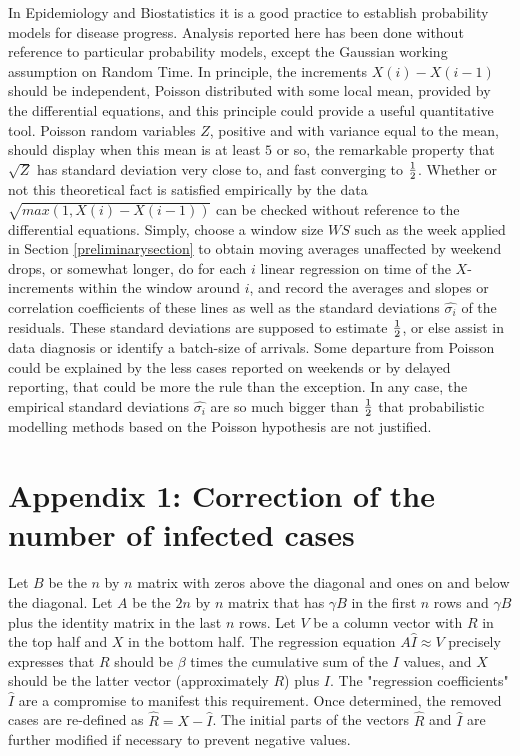 \documentclass{article}
\begin{document}
{In Epidemiology and Biostatistics it is a good practice to establish probability models for disease progress. Analysis reported here has been done without reference to particular probability models, except the Gaussian working assumption on Random Time. In principle, the increments \linebreak $X(i)-X(i-1)$ should be independent, Poisson distributed with some local mean, provided by the differential equations, and this principle could provide a useful quantitative tool. Poisson random variables $Z$, positive and with variance equal to the mean, should display when this mean is at least $5$ or so, the remarkable property that $\sqrt{Z}$ has standard deviation very close to, and fast converging to ${1 \over 2}$. Whether or not this theoretical fact is satisfied empirically by the data $\sqrt{max(1,X(i)-X(i-1))}$ can be checked without reference to the differential equations. Simply, choose a window size $WS$ such as the week applied in Section \ref{preliminarysection} to obtain moving averages unaffected by weekend drops, or somewhat longer, do for each $i$ linear regression on time of the $X$-increments within the window around $i$, and record the averages and slopes or correlation coefficients of these lines as well as the standard deviations $\hat{\sigma_i}$ of the residuals. These standard deviations are supposed to estimate ${1 \over 2}$, or else assist in data diagnosis or identify a batch-size of arrivals. Some departure from Poisson could be explained by the less cases reported on weekends or by delayed reporting, that could be more the rule than the exception. In any case, the empirical standard deviations $\hat{\sigma_i}$ are so much bigger than ${1 \over 2}$ that probabilistic modelling methods based on the Poisson hypothesis are not justified.

\section{Appendix 1: Correction of the number of infected cases}

Let $B$ be the $n$ by $n$ matrix with zeros above the diagonal and ones on and below the diagonal. Let $A$ be the $2 n$ by $n$ matrix that has $\gamma B$ in the first $n$ rows and $\gamma B$ plus the identity matrix in the last $n$ rows. Let $V$ be a column vector with $R$ in the top half and $X$ in the bottom half. The regression equation $A \hat{I} \approx V$
precisely expresses that $R$ should be $\beta$ times the cumulative sum of the $I$ values, and $X$ should be the latter vector (approximately $R$) plus $I$. The "regression coefficients" $\hat{I}$ are a compromise to manifest this requirement. Once determined, the removed cases are re-defined as $\hat{R}=X-\hat{I}$. The initial parts
 of the vectors $\hat{R}$ and $\hat{I}$ are further modified if necessary to prevent negative values.




}
\end{document}
